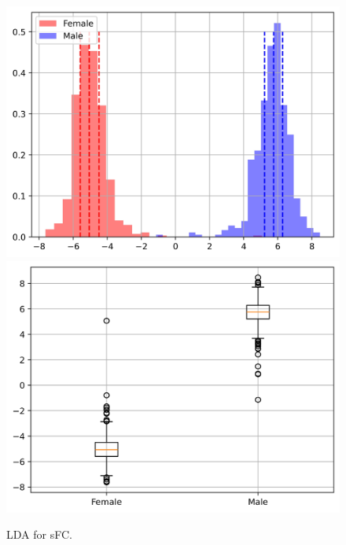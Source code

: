\documentclass[11pt]{article}
\begin{document}
\begin{figure}[H]
{\begin{minipage}[b]{0.3\textwidth}
            \includegraphics[width=1\textwidth]{../Analysis/LDA/node=50_size=4800_step=4800_rho=0.1/hist_0.jpg}
            \includegraphics[width=1\textwidth]{../Analysis/LDA/node=50_size=4800_step=4800_rho=0.1/box_0.jpg}
        \end{minipage}
    }
    \caption{LDA for sFC.}
    \label{LDA-example-sfc}
\end{figure}
\end{document}
